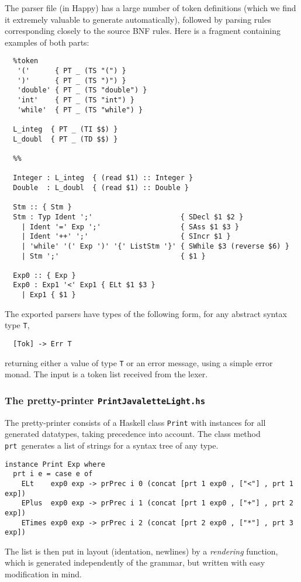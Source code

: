 \documentclass[10pt]{article}
\begin{document}
The parser file (in Happy) has a large number of token definitions
(which we find it extremely valuable to generate automatically),
followed by parsing rules corresponding closely to the source BNF rules.
Here is a fragment containing examples of both parts:
\small
\begin{verbatim}
  %token 
   '('      { PT _ (TS "(") }
   ')'      { PT _ (TS ")") }
   'double' { PT _ (TS "double") }
   'int'    { PT _ (TS "int") }
   'while'  { PT _ (TS "while") }

  L_integ  { PT _ (TI $$) }
  L_doubl  { PT _ (TD $$) }

  %%

  Integer : L_integ  { (read $1) :: Integer }
  Double  : L_doubl  { (read $1) :: Double }

  Stm :: { Stm }
  Stm : Typ Ident ';'                     { SDecl $1 $2 } 
    | Ident '=' Exp ';'                   { SAss $1 $3 }
    | Ident '++' ';'                      { SIncr $1 }
    | 'while' '(' Exp ')' '{' ListStm '}' { SWhile $3 (reverse $6) }
    | Stm ';'                             { $1 }

  Exp0 :: { Exp }
  Exp0 : Exp1 '<' Exp1 { ELt $1 $3 } 
    | Exp1 { $1 }
\end{verbatim} %
\normalsize
The exported parsers have types of the following 
form, for any abstract syntax type {\tt T},
\begin{verbatim}
  [Tok] -> Err T
\end{verbatim}
returning either a value of type {\tt T} or an error message, using
a simple error monad. The input is a token list received from the lexer.


\subsubsection{The pretty-printer {\tt PrintJavaletteLight.hs}}

The pretty-printer consists of a Haskell class {\tt Print} with instances
for all generated datatypes, taking precedence into account. The class method
{\tt prt}\
generates a list of strings for a syntax tree of any type.
\small
\begin{verbatim}
instance Print Exp where
  prt i e = case e of
    ELt    exp0 exp -> prPrec i 0 (concat [prt 1 exp0 , ["<"] , prt 1 exp])
    EPlus  exp0 exp -> prPrec i 1 (concat [prt 1 exp0 , ["+"] , prt 2 exp])
    ETimes exp0 exp -> prPrec i 2 (concat [prt 2 exp0 , ["*"] , prt 3 exp])
\end{verbatim}
\normalsize
The list is then put in layout (identation, newlines) by a \textit{rendering}
function, which is generated independently of the grammar,
but written with easy modification in mind.
\end{document}
